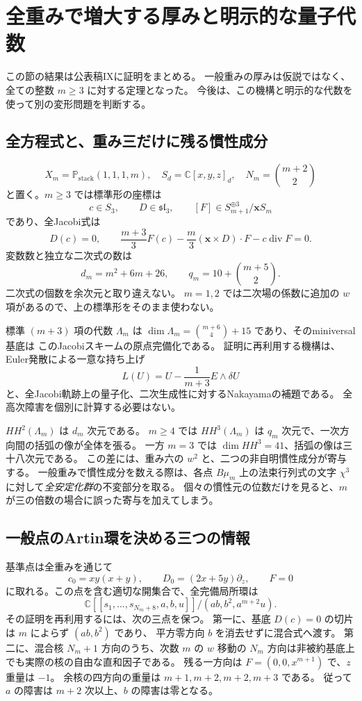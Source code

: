 \section{全重みで増大する厚みと明示的な量子代数}
\label{sec:allm-notes-v33}

この節の結果は公表稿IX\cite{PaperIX}に証明をまとめる。
一般重みの厚みは仮説ではなく、全ての整数 $m\ge3$ に対する定理となった。
今後は、この機構と明示的な代数を使って別の変形問題を判断する。

\subsection{全方程式と、重み三だけに残る慣性成分}
\[
 X_m=\mathbb P_{\mathrm{stack}}(1,1,1,m),\quad
 S_d=\mathbb C[x,y,z]_d,\quad N_m=\binom{m+2}{2}
\]
と置く。$m\ge3$ では標準形の座標は
\[
 c\in S_3,\qquad D\in\mathfrak{sl}_3,\qquad
 [F]\in S_{m+1}^{\oplus3}/\mathbf xS_m
\]
であり、全Jacobi式は
\[
 D(c)=0,\qquad
 \frac{m+3}{3}F(c)-\frac m3(\mathbf x\times D)\cdot F-c\operatorname{div}F=0.
\]
変数数と独立な二次式の数は
\[
 d_m=m^2+6m+26,\qquad q_m=10+\binom{m+5}{2}.
\]
二次式の個数を余次元と取り違えない。
$m=1,2$ では二次場の係数に追加の $w$ 項があるので、上の標準形をそのまま使わない。

標準 $(m+3)$ 項の代数 $\Lambda_m$ は
$\dim\Lambda_m=\binom{m+6}{4}+15$ であり、そのminiversal基底は
このJacobiスキームの原点完備化である。
証明に再利用する機構は、Euler発散による一意な持ち上げ
\[
 L(U)=U-\frac1{m+3}E\wedge\delta U
\]
と、全Jacobi軌跡上の量子化、二次生成性に対するNakayamaの補題である。
全高次障害を個別に計算する必要はない。

$HH^2(\Lambda_m)$ は $d_m$ 次元である。
$m\ge4$ では $HH^3(\Lambda_m)$ は $q_m$ 次元で、一次方向間の括弧の像が全体を張る。
一方 $m=3$ では $\dim HH^3=41$、括弧の像は三十八次元である。
この差には、重み六の $w^2$ と、二つの非自明慣性成分が寄与する。
一般重みで慣性成分を数える際は、各点 $B\mu_m$ 上の法束行列式の文字
$\chi^3$ に対して\emph{全安定化群}の不変部分を取る。
個々の慣性元の位数だけを見ると、$m$ が三の倍数の場合に誤った寄与を加えてしまう。

\subsection{一般点のArtin環を決める三つの情報}
基準点は全重みを通じて
\[
 c_0=xy(x+y),\qquad D_0=(2x+5y)\partial_z,\qquad F=0
\]
に取れる。この点を含む適切な開集合で、全完備局所環は
\[
 \boxed{\mathbb C[[s_1,\ldots,s_{N_m+8},a,b,u]]/(ab,b^2,a^{m+2}u)}.
\]
その証明を再利用するには、次の三点を保つ。
第一に、基底 $D(c)=0$ の切片は $m$ によらず $(ab,b^2)$ であり、
平方零方向 $b$ を消去せずに混合式へ渡す。
第二に、混合核 $N_m+1$ 方向のうち、次数 $m$ の $w$ 移動の
$N_m$ 方向は非被約基底上でも実際の核の自由な直和因子である。
残る一方向は $F=(0,0,x^{m+1})$ で、$z$ 重量は $-1$。
余核の四方向の重量は $m+1,m+2,m+2,m+3$ である。
従って $a$ の障害は $m+2$ 次以上、$b$ の障害は零となる。

